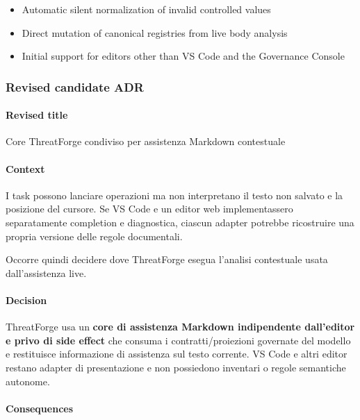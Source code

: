 \documentclass[
  10pt,
]{article}
\providecommand{\tightlist}{%
  \setlength{\itemsep}{0pt}\setlength{\parskip}{0pt}}
\begin{document}
\begin{itemize}
\tightlist
\item
  Automatic silent normalization of invalid controlled values
\item
  Direct mutation of canonical registries from live body analysis
\item
  Initial support for editors other than VS Code and the Governance
  Console
\end{itemize}

\subsubsection{Revised candidate ADR}\label{revised-candidate-adr-14}

\paragraph{Revised title}\label{revised-title-14}

Core ThreatForge condiviso per assistenza Markdown contestuale

\paragraph{Context}\label{context-29}

I task possono lanciare operazioni ma non interpretano il testo non
salvato e la posizione del cursore. Se VS Code e un editor web
implementassero separatamente completion e diagnostica, ciascun adapter
potrebbe ricostruire una propria versione delle regole documentali.

Occorre quindi decidere dove ThreatForge esegua l'analisi contestuale
usata dall'assistenza live.

\paragraph{Decision}\label{decision-29}

ThreatForge usa un \textbf{core di assistenza Markdown indipendente
dall'editor e privo di side effect} che consuma i contratti/proiezioni
governate del modello e restituisce informazione di assistenza sul testo
corrente. VS Code e altri editor restano adapter di presentazione e non
possiedono inventari o regole semantiche autonome.

\paragraph{Consequences}\label{consequences-29}
\end{document}
